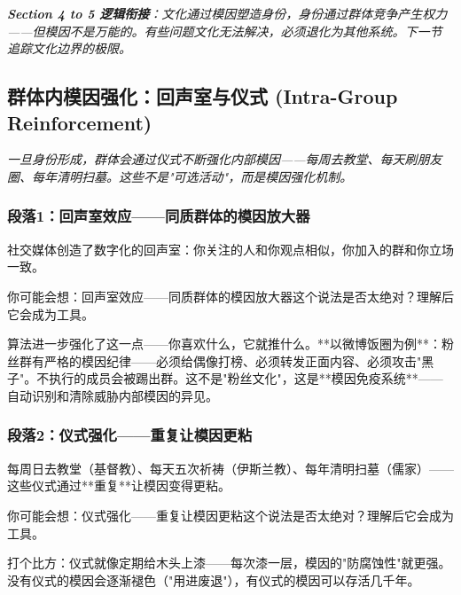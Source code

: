 \documentclass[a4paper,12pt]{book}
\newenvironment{motivation}{\begin{tcolorbox}[colback=gray!10,colframe=gray!60,title=\textit{本章动机},fonttitle=\bfseries,arc=0mm,leftrule=3mm]\small\itshape}{\end{tcolorbox}}
\begin{document}
\begin{motivation}
\begin{motivation}
\begin{motivation}
	\textbf{Section 4 to 5 逻辑衔接}：文化通过模因塑造身份，身份通过群体竞争产生权力——但模因不是万能的。有些问题文化无法解决，必须退化为其他系统。下一节追踪文化边界的极限。

	
	\subsection{群体内模因强化：回声室与仪式 (Intra-Group Reinforcement)}
	\begin{motivation}
		一旦身份形成，群体会通过仪式不断强化内部模因——每周去教堂、每天刷朋友圈、每年清明扫墓。这些不是"可选活动"，而是模因强化机制。
	\end{motivation}

	\subsubsection*{段落1：回声室效应——同质群体的模因放大器}
	社交媒体创造了数字化的回声室：你关注的人和你观点相似，你加入的群和你立场一致。
	\begin{tcolorbox}[colback=yellow!5, title=\textit{读者行为预测}]
		你可能会想：回声室效应——同质群体的模因放大器这个说法是否太绝对？理解后它会成为工具。
	\end{tcolorbox}

算法进一步强化了这一点——你喜欢什么，它就推什么。**以微博饭圈为例**：粉丝群有严格的模因纪律——必须给偶像打榜、必须转发正面内容、必须攻击"黑子"。不执行的成员会被踢出群。这不是"粉丝文化"，这是**模因免疫系统**——自动识别和清除威胁内部模因的异见。

	\subsubsection*{段落2：仪式强化——重复让模因更粘}
	每周日去教堂（基督教）、每天五次祈祷（伊斯兰教）、每年清明扫墓（儒家）——这些仪式通过**重复**让模因变得更粘。
	\begin{tcolorbox}[colback=yellow!5, title=\textit{读者行为预测}]
		你可能会想：仪式强化——重复让模因更粘这个说法是否太绝对？理解后它会成为工具。
	\end{tcolorbox}

打个比方：仪式就像定期给木头上漆——每次漆一层，模因的"防腐蚀性"就更强。没有仪式的模因会逐渐褪色（"用进废退"），有仪式的模因可以存活几千年。


\end{motivation}
\end{motivation}
\end{motivation}
\end{document}
